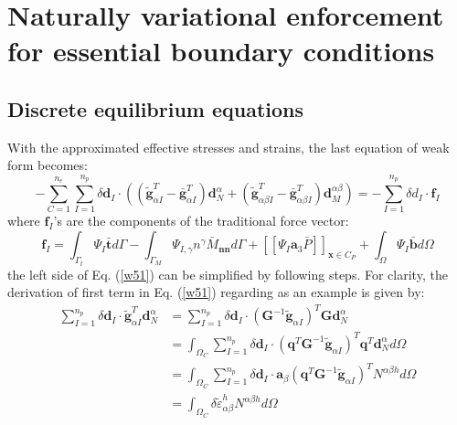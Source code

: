 \section{Naturally variational enforcement for essential boundary conditions}\label{boundary}
\subsection{Discrete equilibrium equations}
With the approximated effective stresses and strains, the last equation of weak form becomes:
\begin{equation}\label{w51}
- \sum_{C=1}^{n_e}\sum_{I=1}^{n_p} \delta \boldsymbol d_I \cdot \left ( (\tilde{\boldsymbol g}^T_{\alpha I} - \bar{\boldsymbol g}^T_{\alpha I}) \boldsymbol d_N^{\alpha}
+ (\tilde{\boldsymbol g}^T_{\alpha\beta I} - \bar{\boldsymbol g}^T_{\alpha\beta I}) \boldsymbol d_M^{\alpha\beta} \right ) = - \sum_{I=1}^{n_p}\delta d_I \cdot \boldsymbol f_I
\end{equation}
where $\boldsymbol f_I$'s are the components of the traditional force vector:
\begin{equation}
        \boldsymbol f_I = \int_{\Gamma_t} \Psi_I \bar{\boldsymbol t} d\Gamma - \int_{\Gamma_M} \Psi_{I,\gamma} n^\gamma \bar M_{\boldsymbol{nn}} d\Gamma + [[\Psi_I\boldsymbol a_3 \bar P]]_{\boldsymbol x\in C_P} + \int_\Omega \Psi_I \bar{\boldsymbol b} d\Omega
\end{equation}
the left side of Eq. (\ref{w51}) can be simplified by following steps. For clarity, the derivation of first term in Eq. (\ref{w51}) regarding as an example is given by:
\begin{equation}
\begin{split}
\sum_{I=1}^{n_p} \delta \boldsymbol d_I \cdot \tilde{\boldsymbol g}^T_{\alpha I} \boldsymbol d_N^\alpha 
&= \sum_{I=1}^{n_p} \delta \boldsymbol d_I \cdot (\boldsymbol G^{-1} \tilde{\boldsymbol g}_{\alpha I})^T  \boldsymbol G \boldsymbol d^\alpha_N \\
&= \int_{\Omega_C} \sum_{I=1}^{n_p} \delta \boldsymbol d_I \cdot (\boldsymbol q^T\boldsymbol G^{-1} \tilde{\boldsymbol g}_{\alpha I})^T  \boldsymbol q^T \boldsymbol d^\alpha_N d\Omega \\
&= \int_{\Omega_C} \sum_{I=1}^{n_p} \delta \boldsymbol d_I \cdot \boldsymbol a_\beta(\boldsymbol q^T\boldsymbol G^{-1} \tilde{\boldsymbol g}_{\alpha I})^T  N^{\alpha\beta h} d\Omega \\
& = \int_{\Omega_C} \delta \tilde \varepsilon_{\alpha\beta}^h N^{\alpha\beta h} d\Omega 
\end{split}
\end{equation}
